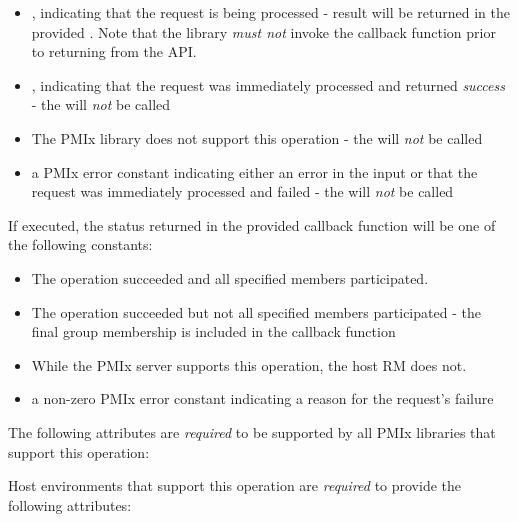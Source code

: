 \begin{itemize}
    \item {}, indicating that the request is being processed - result will be returned in the provided . Note that the library \emph{must not} invoke the callback function prior to returning from the \ac{API}.
    \item {}, indicating that the request was immediately processed and returned \textit{success} - the  will \textit{not} be called
    \item {} The \ac{PMIx} library does not support this operation - the  will \textit{not} be called
    \item a PMIx error constant indicating either an error in the input or that the request was immediately processed and failed - the  will \textit{not} be called
\end{itemize}

If executed, the status returned in the provided callback function will be one of the following constants:

\begin{itemize}
\item {} The operation succeeded and all specified members participated.
\item {} The operation succeeded but not all specified members participated - the final group membership is included in the callback function
\item {} While the \ac{PMIx} server supports this operation, the host \ac{RM} does not.
\item a non-zero \ac{PMIx} error constant indicating a reason for the request's failure
\end{itemize}

\reqattrstart
The following attributes are \textit{required} to be supported by all \ac{PMIx} libraries that support this operation:


Host environments that support this operation are \textit{required} to provide the following attributes:


\reqattrend

